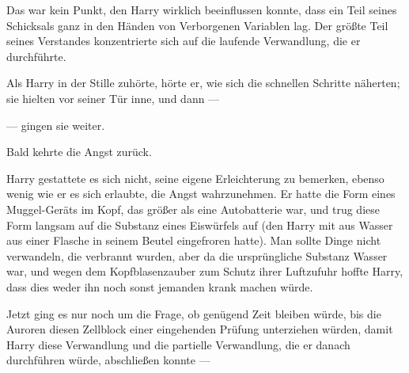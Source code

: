 Das war kein Punkt, den Harry wirklich beeinflussen konnte, dass ein Teil seines Schicksals ganz in den Händen von Verborgenen Variablen lag. Der größte Teil seines Verstandes konzentrierte sich auf die laufende Verwandlung, die er durchführte.

Als Harry in der Stille zuhörte, hörte er, wie sich die schnellen Schritte näherten; sie hielten vor seiner Tür inne, und dann —

— gingen sie weiter.

Bald kehrte die Angst zurück.

Harry gestattete es sich nicht, seine eigene Erleichterung zu bemerken, ebenso wenig wie er es sich erlaubte, die Angst wahrzunehmen. Er hatte die Form eines Muggel-Geräts im Kopf, das größer als eine Autobatterie war, und trug diese Form langsam auf die Substanz eines Eiswürfels auf (den Harry mit  aus Wasser aus einer Flasche in seinem Beutel eingefroren hatte). Man sollte Dinge nicht verwandeln, die verbrannt wurden, aber da die ursprüngliche Substanz Wasser war, und wegen dem Kopfblasenzauber zum Schutz ihrer Luftzufuhr hoffte Harry, dass dies weder ihn noch sonst jemanden krank machen würde.

Jetzt ging es nur noch um die Frage, ob genügend Zeit bleiben würde, bis die Auroren diesen Zellblock einer eingehenden Prüfung unterziehen würden, damit Harry diese Verwandlung und die partielle Verwandlung, die er danach durchführen würde, abschließen konnte —

